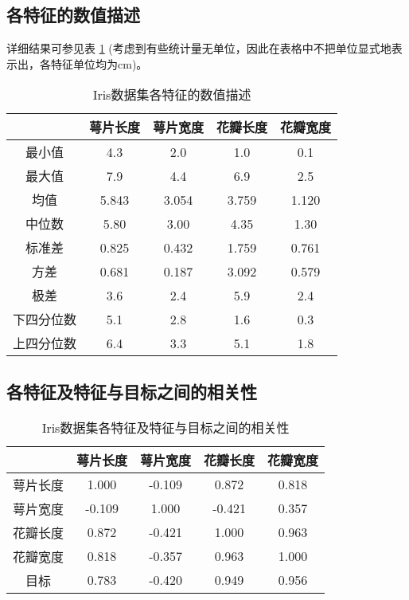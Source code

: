 \documentclass[12pt,a4paper]{article}
\theoremstyle{definition}
\begin{document}
\subsection{各特征的数值描述}

详细结果可参见表 \ref{tab:iris_att} (考虑到有些统计量无单位，因此在表格中不把单位显式地表示出，各特征单位均为cm)。

\begin{table}[H]
	\renewcommand\arraystretch{1.35}
	\caption{Iris数据集各特征的数值描述}
	\label{tab:iris_att}
	\centering
	
	\begin{tabular}{c|cccc}
		\centering
		 & 萼片长度 & 萼片宽度 & 花瓣长度 & 花瓣宽度 \\
		\hline
		最小值 & 4.3 & 2.0 & 1.0 & 0.1 \\
		最大值 & 7.9 & 4.4 & 6.9 & 2.5 \\
		均值 & 5.843 & 3.054 & 3.759 & 1.120 \\
		中位数 & 5.80 & 3.00 & 4.35 & 1.30 \\
		标准差 & 0.825 & 0.432 & 1.759 & 0.761 \\
		方差 & 0.681 & 0.187 & 3.092 & 0.579 \\
		极差 & 3.6 & 2.4 & 5.9 & 2.4 \\
		下四分位数 & 5.1 & 2.8 & 1.6 & 0.3 \\
		上四分位数 & 6.4 & 3.3 & 5.1 & 1.8 \\
	\end{tabular}
\end{table}

\subsection{各特征及特征与目标之间的相关性}
\label{sec:iris_coff}

\begin{table}[H]
	\renewcommand\arraystretch{1.35}
	\caption{Iris数据集各特征及特征与目标之间的相关性}
	\label{tab:iris_co}
	\centering
	
	\begin{tabular}{c|cccc}
		\centering
		 & 萼片长度 & 萼片宽度 & 花瓣长度 & 花瓣宽度 \\
		\hline
		萼片长度 & 1.000 & -0.109 & 0.872 & 0.818 \\
		萼片宽度 & -0.109 & 1.000 & -0.421 & 0.357 \\
		花瓣长度 & 0.872 & -0.421 & 1.000 & 0.963 \\
		花瓣宽度 & 0.818 & -0.357 & 0.963 & 1.000 \\
		目标 & 0.783 & -0.420 & 0.949 & 0.956 \\
	\end{tabular}
\end{table}
\end{document}
